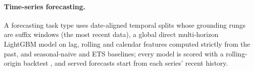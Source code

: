 \paragraph{Time-series forecasting.} A forecasting task type uses date-aligned temporal splits whose grounding rungs are suffix windows (the most recent data), a global direct multi-horizon LightGBM model on lag, rolling and calendar features computed strictly from the past, and seasonal-naive and ETS baselines; every model is scored with a rolling-origin backtest \citep{hyndman2021fpp3}, and served forecasts start from each series' recent history.
